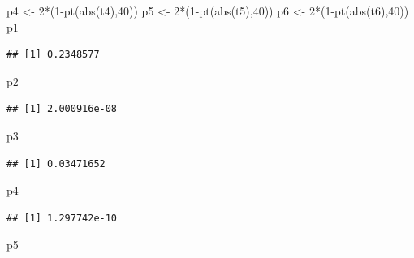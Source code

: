 \documentclass[
]{book}
\newenvironment{Shaded}{\begin{snugshade}}{\end{snugshade}}
\newcommand{\DecValTok}[1]{\textcolor[rgb]{0.00,0.00,0.81}{#1}}
\newcommand{\FunctionTok}[1]{\textcolor[rgb]{0.00,0.00,0.00}{#1}}
\newcommand{\NormalTok}[1]{#1}
\newcommand{\OtherTok}[1]{\textcolor[rgb]{0.56,0.35,0.01}{#1}}
\newcommand{\SpecialCharTok}[1]{\textcolor[rgb]{0.00,0.00,0.00}{#1}}
\begin{document}
\begin{Shaded}
\begin{Highlighting}[]
\NormalTok{p4 }\OtherTok{\textless{}{-}} \DecValTok{2}\SpecialCharTok{*}\NormalTok{(}\DecValTok{1}\SpecialCharTok{{-}}\FunctionTok{pt}\NormalTok{(}\FunctionTok{abs}\NormalTok{(t4),}\DecValTok{40}\NormalTok{))}
\NormalTok{p5 }\OtherTok{\textless{}{-}} \DecValTok{2}\SpecialCharTok{*}\NormalTok{(}\DecValTok{1}\SpecialCharTok{{-}}\FunctionTok{pt}\NormalTok{(}\FunctionTok{abs}\NormalTok{(t5),}\DecValTok{40}\NormalTok{))}
\NormalTok{p6 }\OtherTok{\textless{}{-}} \DecValTok{2}\SpecialCharTok{*}\NormalTok{(}\DecValTok{1}\SpecialCharTok{{-}}\FunctionTok{pt}\NormalTok{(}\FunctionTok{abs}\NormalTok{(t6),}\DecValTok{40}\NormalTok{))}
\NormalTok{p1}
\end{Highlighting}
\end{Shaded}

\begin{verbatim}
## [1] 0.2348577
\end{verbatim}

\begin{Shaded}
\begin{Highlighting}[]
\NormalTok{p2}
\end{Highlighting}
\end{Shaded}

\begin{verbatim}
## [1] 2.000916e-08
\end{verbatim}

\begin{Shaded}
\begin{Highlighting}[]
\NormalTok{p3}
\end{Highlighting}
\end{Shaded}

\begin{verbatim}
## [1] 0.03471652
\end{verbatim}

\begin{Shaded}
\begin{Highlighting}[]
\NormalTok{p4}
\end{Highlighting}
\end{Shaded}

\begin{verbatim}
## [1] 1.297742e-10
\end{verbatim}

\begin{Shaded}
\begin{Highlighting}[]
\NormalTok{p5}
\end{Highlighting}
\end{Shaded}
\end{document}
